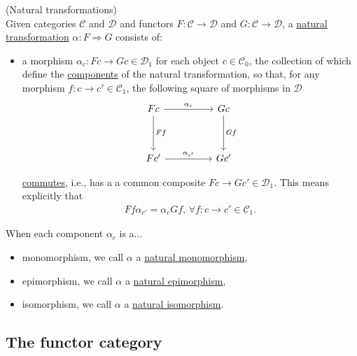 \begin{definition}{(Natural transformations)}\label{def:natural_transformation}\\
\noindent Given categories $\mathcal{C}$ and $\mathcal{D}$ and functors $F : \mathcal{C} \rightarrow \mathcal{D}$ and
$G : \mathcal{C} \rightarrow \mathcal{D}$, a \ul{natural transformation} $\alpha : F \Rightarrow G$ consists of:
\begin{itemize}
\item a morphism $\alpha_{c} : Fc \rightarrow Gc \in \mathcal{D}_{1}$ for each object $c \in \mathcal{C}_{0}$, the collection of which
define the \ul{components} of the natural transformation, so that, for any morphism $f : c \rightarrow c' \in \mathcal{C}_{1}$, the following
square of morphisms in $\mathcal{D}$
\[
\begin{tikzcd}
Fc \arrow[rr, "\alpha_{c}"] \arrow[dd, "Ff"] &  & Gc \arrow[dd, "Gf"] \\
                                             &  &                     \\
Fc' \arrow[rr, "\alpha_{c'}"]                &  & Gc'                
\end{tikzcd}
\]

\ul{commutes}, i.e., has a a common composite $Fc \rightarrow Gc' \in \mathcal{D}_{1}$. This means explicitly that
\begin{align}
Ff \alpha_{c'} = \alpha_{c} Gf,\,\forall f : c \rightarrow c' \in \mathcal{C}_{1}. \label{eq:naturality_condition}
\end{align}
\end{itemize}
\end{definition}

\begin{definition}
When each component $\alpha_{c}$ is a...
\begin{itemize}
\item monomorphism, we call $\alpha$ a \ul{natural monomorphism},
\item epimorphism, we call $\alpha$ a \ul{natural epimorphism},
\item isomorphism, we call $\alpha$ a \ul{natural isomorphism}.
\end{itemize}
\end{definition}

\subsection{The functor category}

